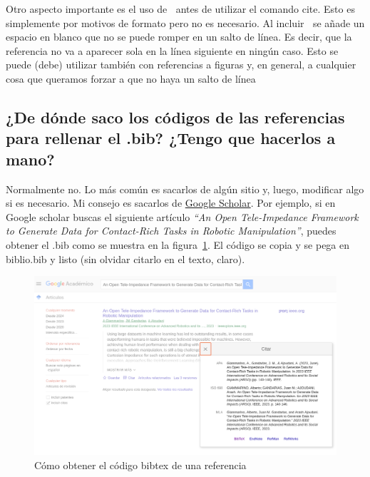 \documentclass{article}
\begin{document}
Otro aspecto importante es el uso de $~$ antes de utilizar el comando cite. Esto es simplemente por motivos de formato pero no es necesario. Al incluir $~$ se añade un espacio en blanco que no se puede romper en un salto de línea. Es decir, que la referencia no va a aparecer sola en la línea siguiente en ningún caso. Esto se puede (debe) utilizar también con referencias a figuras y, en general, a cualquier cosa que queramos forzar a que no haya un salto de línea

\subsection{¿De dónde saco los códigos de las referencias para rellenar el .bib? ¿Tengo que hacerlos a mano?}

Normalmente no. Lo más común es sacarlos de algún sitio y, luego, modificar algo si es necesario. Mi consejo es sacarlos de \href{https://scholar.google.es/}{Google Scholar}. Por ejemplo, si en Google scholar buscas el siguiente artículo \textit{``An Open Tele-Impedance Framework to Generate Data for Contact-Rich Tasks in Robotic Manipulation''}, puedes obtener el .bib como se muestra en la figura~\ref{fig:scholar}. El código se copia y se pega en biblio.bib y listo (sin olvidar citarlo en el texto, claro).

\begin{figure}
    \centering
    \includegraphics[width=0.7\linewidth]{Images/scholar_bib.png}
    \caption{Cómo obtener el código bibtex de una referencia}
    \label{fig:scholar}
\end{figure}


 



\end{document}
